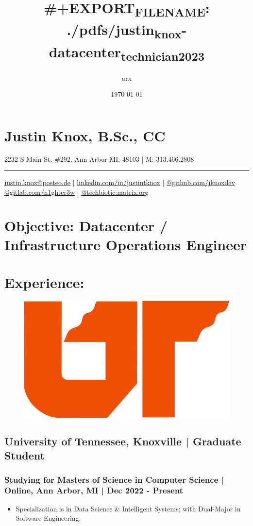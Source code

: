 \documentclass[letter,10pt]{article}
\author{arx}
\date{\today}
\title{\#+EXPORT\textsubscript{FILE}\textsubscript{NAME}: ./pdfs/justin\textsubscript{knox}-datacenter\textsubscript{technician}\textsubscript{2023}}
\begin{document}
\maketitle
\section*{Justin Knox, B.Sc., CC}
\label{sec:org432d7d9}
2232 S Main St. \#292, Ann Arbor MI, 48103 | M: 313.466.2808

\noindent\rule{\textwidth}{0.5pt}
\href{mailto:justin.knox@posteo.de}{justin.knox@posteo.de} | \href{https://www.linkedin.com/in/justintknox}{linkedin.com/in/justintknox} | \href{https://www.github.com/jknoxdev}{@github.com/jknoxdev} \\
\href{https://gitlab.com/n1ghtcr3w}{@gitlab.com/n1ghtcr3w} | \href{https://matrix.to/\#/@techbiotic:matrix.org}{@techbiotic:matrix.org}


\section*{Objective:              Datacenter / Infrastructure Operations Engineer}
\label{sec:org3d35977}
\section*{Experience:}
\label{sec:org9ab1147}
\begin{figure}
\includegraphics[width=0.45\linewidth]{./img/50p_cr_utk.jpg}
\end{figure}

\subsection*{University of Tennessee, Knoxville | Graduate Student}
\label{sec:org18cb071}
\subsubsection*{Studying for Masters of Science in Computer Science | Online, Ann Arbor, MI | Dec 2022 - Present}
\label{sec:orga3ac291}
\begin{itemize}
\item Specialization is in Data Science \& Intelligent Systems; with Dual-Major in Software Engineering.
\end{itemize}
\end{document}
